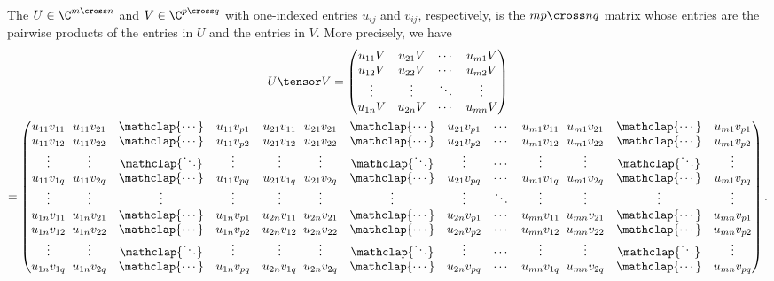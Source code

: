 \begin{definition}[Tensor product]
  \def\icdots{\mathclap{\cdots}}
  \def\iddots{\mathclap{\ddots}}
  The  $U \in \C^{m \cross n}$ and $V \in \C^{p
  \cross q}$ with one-indexed\footnotemark{} entries $u_{ij}$ and $v_{ij}$,
  respectively, is the $mp \cross nq$ matrix whose entries are the pairwise
  products of the entries in $U$ and the entries in $V$.  More precisely, we
  have \begin{gather*}
    U \tensor V =
    \begin{pmatrix}
      u_{11}V & u_{21}V & \cdots & u_{m1}V \\
      u_{12}V & u_{22}V & \cdots & u_{m2}V \\
      \vdots & \vdots & \ddots & \vdots \\
      u_{1n}V & u_{2n}V & \cdots & u_{mn}V
    \end{pmatrix} \\ =
    \left(\begin{array}{@{}*{2}{c@{\;\;}ccc}cc@{\;\;}ccc@{}}
      u_{11}v_{11} & u_{11}v_{21} & \icdots & u_{11}v_{p1} &
      u_{21}v_{11} & u_{21}v_{21} & \icdots & u_{21}v_{p1} &
      \cdots &
      u_{m1}v_{11} & u_{m1}v_{21} & \icdots & u_{m1}v_{p1}
      \\
      u_{11}v_{12} & u_{11}v_{22} & \icdots & u_{11}v_{p2} &
      u_{21}v_{12} & u_{21}v_{22} & \icdots & u_{21}v_{p2} &
      \cdots &
      u_{m1}v_{12} & u_{m1}v_{22} & \icdots & u_{m1}v_{p2}
      \\
      \vdots & \vdots & \iddots & \vdots &
      \vdots & \vdots & \iddots & \vdots &
      \cdots &
      \vdots & \vdots & \iddots & \vdots
      \\
      u_{11}v_{1q} & u_{11}v_{2q} & \icdots & u_{11}v_{pq} &
      u_{21}v_{1q} & u_{21}v_{2q} & \icdots & u_{21}v_{pq} &
      \cdots &
      u_{m1}v_{1q} & u_{m1}v_{2q} & \icdots & u_{m1}v_{pq}
      \\
      \vdots & \vdots & \vdots & \vdots &
      \vdots & \vdots & \vdots & \vdots &
      \ddots &
      \vdots & \vdots & \vdots & \vdots
      \\
      u_{1n}v_{11} & u_{1n}v_{21} & \icdots & u_{1n}v_{p1} &
      u_{2n}v_{11} & u_{2n}v_{21} & \icdots & u_{2n}v_{p1} &
      \cdots &
      u_{mn}v_{11} & u_{mn}v_{21} & \icdots & u_{mn}v_{p1}
      \\
      u_{1n}v_{12} & u_{1n}v_{22} & \icdots & u_{1n}v_{p2} &
      u_{2n}v_{12} & u_{2n}v_{22} & \icdots & u_{2n}v_{p2} &
      \cdots &
      u_{mn}v_{12} & u_{mn}v_{22} & \icdots & u_{mn}v_{p2}
      \\
      \vdots & \vdots & \iddots & \vdots &
      \vdots & \vdots & \iddots & \vdots &
      \cdots &
      \vdots & \vdots & \iddots & \vdots
      \\
      u_{1n}v_{1q} & u_{1n}v_{2q} & \icdots & u_{1n}v_{pq} &
      u_{2n}v_{1q} & u_{2n}v_{2q} & \icdots & u_{2n}v_{pq} &
      \cdots &
      u_{mn}v_{1q} & u_{mn}v_{2q} & \icdots & u_{mn}v_{pq}
    \end{array}\right).%
  \end{gather*}

\end{definition}

